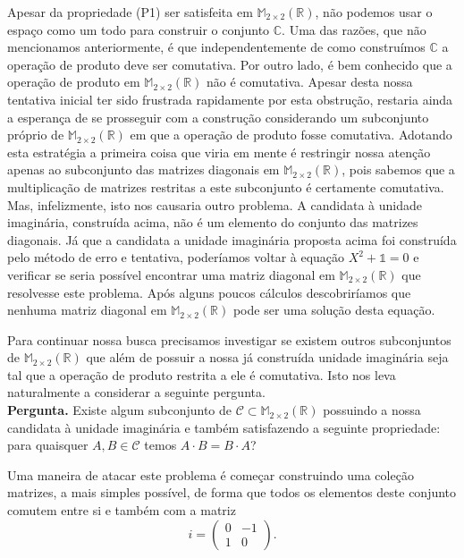 Apesar da propriedade (P1) ser satisfeita em $\mathbb{M}_{2\times 2}(\mathbb{R})$, não podemos
usar o espaço como um todo para construir o conjunto $\mathbb{C}$. Uma das razões, que não mencionamos anteriormente, 
é que independentemente de como construímos $\mathbb{C}$ a operação de produto deve ser comutativa.
Por outro lado, é bem conhecido que a operação de produto em $\mathbb{M}_{2\times 2}(\mathbb{R})$ não é comutativa. 
Apesar desta nossa tentativa inicial ter sido frustrada rapidamente por esta obstrução, 
restaria ainda a esperança de se prosseguir
com a construção considerando um subconjunto próprio de $\mathbb{M}_{2\times 2}(\mathbb{R})$ 
em que a operação de produto fosse comutativa. 
Adotando esta estratégia a primeira coisa que viria em mente é restringir nossa atenção apenas ao subconjunto 
das matrizes diagonais em $\mathbb{M}_{2\times 2}(\mathbb{R})$, pois sabemos que a multiplicação de matrizes restritas 
a este subconjunto é certamente comutativa. 
Mas, infelizmente, isto nos causaria outro problema. A candidata à unidade imaginária, 
construída acima, não é um elemento do conjunto das matrizes diagonais. 
Já que a candidata a unidade imaginária proposta acima foi construída pelo método de erro e tentativa,  
poderíamos voltar à equação $X^2+\mathds{1}=0$ e verificar 
se seria possível encontrar uma matriz diagonal em $\mathbb{M}_{2\times 2}(\mathbb{R})$ 
que resolvesse este problema. Após alguns poucos cálculos descobriríamos que nenhuma matriz 
diagonal em $\mathbb{M}_{2\times 2}(\mathbb{R})$ pode ser uma solução desta equação.


Para continuar nossa busca precisamos investigar se existem outros 
subconjuntos de $\mathbb{M}_{2\times 2}(\mathbb{R})$ que além de possuir a nossa já construída unidade imaginária 
seja tal que a operação de produto restrita a ele é comutativa. 
Isto nos leva naturalmente a considerar a seguinte pergunta. 
\\
{\bf Pergunta.} Existe algum subconjunto de 
$\mathscr{C}\subset \mathbb{M}_{2\times 2}(\mathbb{R})$ possuindo a nossa candidata à unidade imaginária e também satisfazendo a seguinte propriedade: para quaisquer $A,B\in \mathscr{C}$ temos 
$A\cdot B = B\cdot A$? 

Uma maneira de atacar este problema é começar construindo uma coleção matrizes, a mais simples possível, 
de forma que todos os elementos deste conjunto comutem entre si e também com a matriz
\[
i= 
\begin{pmatrix}
0&-1\\
1&0
\end{pmatrix}.
\]

